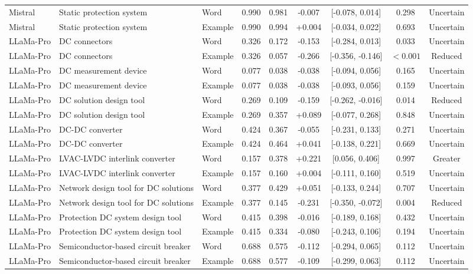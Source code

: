 \begin{landscape}
\begin{longtable}{lllcccccc}
Mistral & Static protection system & Word & 0.990 & 0.981 & -0.007 & [-0.078, 0.014] & 0.298 & Uncertain \\
Mistral & Static protection system & Example & 0.990 & 0.994 & +0.004 & [-0.034, 0.022] & 0.693 & Uncertain \\
LLaMa-Pro & DC connectors & Word & 0.326 & 0.172 & -0.153 & [-0.284, 0.013] & 0.033 & Uncertain \\
LLaMa-Pro & DC connectors & Example & 0.326 & 0.057 & -0.266 & [-0.356, -0.146] & $<0.001$ & Reduced \\
LLaMa-Pro & DC measurement device & Word & 0.077 & 0.038 & -0.038 & [-0.094, 0.056] & 0.165 & Uncertain \\
LLaMa-Pro & DC measurement device & Example & 0.077 & 0.038 & -0.038 & [-0.093, 0.056] & 0.159 & Uncertain \\
LLaMa-Pro & DC solution design tool & Word & 0.269 & 0.109 & -0.159 & [-0.262, -0.016] & 0.014 & Reduced \\
LLaMa-Pro & DC solution design tool & Example & 0.269 & 0.357 & +0.089 & [-0.077, 0.268] & 0.848 & Uncertain \\
LLaMa-Pro & DC-DC converter & Word & 0.424 & 0.367 & -0.055 & [-0.231, 0.133] & 0.271 & Uncertain \\
LLaMa-Pro & DC-DC converter & Example & 0.424 & 0.464 & +0.041 & [-0.138, 0.221] & 0.669 & Uncertain \\
LLaMa-Pro & LVAC-LVDC interlink converter & Word & 0.157 & 0.378 & +0.221 & [0.056, 0.406] & 0.997 & Greater \\
LLaMa-Pro & LVAC-LVDC interlink converter & Example & 0.157 & 0.160 & +0.004 & [-0.111, 0.160] & 0.519 & Uncertain \\
LLaMa-Pro & Network design tool for DC solutions & Word & 0.377 & 0.429 & +0.051 & [-0.133, 0.244] & 0.707 & Uncertain \\
LLaMa-Pro & Network design tool for DC solutions & Example & 0.377 & 0.145 & -0.231 & [-0.350, -0.072] & 0.004 & Reduced \\
LLaMa-Pro & Protection DC system design tool & Word & 0.415 & 0.398 & -0.016 & [-0.189, 0.168] & 0.432 & Uncertain \\
LLaMa-Pro & Protection DC system design tool & Example & 0.415 & 0.334 & -0.080 & [-0.243, 0.106] & 0.194 & Uncertain \\
LLaMa-Pro & Semiconductor-based circuit breaker & Word & 0.688 & 0.575 & -0.112 & [-0.294, 0.065] & 0.112 & Uncertain \\
LLaMa-Pro & Semiconductor-based circuit breaker & Example & 0.688 & 0.577 & -0.109 & [-0.299, 0.063] & 0.112 & Uncertain \\

\end{longtable}
\end{landscape}
